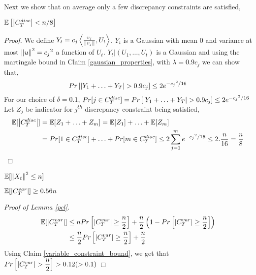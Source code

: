 Next we show that on average only a few discrepancy constraints are satisfied,
\begin{Claim}
$\mathbb{E}\left[\left\lvert C_T^{disc} \right\rvert < n/8 \right]$
\end{Claim}
\begin{proof}
We define $Y_t = c_j\left\langle \frac{v_j}{\left\lVert v_j \right\rVert},U_t\right\rangle$. $Y_t$ is a Gaussian with mean 0 and variance at most $\left\lVert u \right\rVert^2 = {c_j}^2$ a function of $U_t$.
$Y_t|(U_1,\hdots,U_t)$ is a Gaussian and using the martingale bound in Claim \ref{gaussian_properties},  with $\lambda = 0.9c_j$ we can show that,
\[Pr\left[ \left\lvert Y_1+\hdots+Y_T \right\rvert > 0.9c_j \right] \leq 2e^{{-c_j}^2/16}\]
For our choice of $\delta = 0.1$, $Pr[j \in C_T^{disc}] = Pr\left[ \left\lvert Y_1+\hdots+Y_T \right\rvert > 0.9c_j \right] \leq 2e^{{-c_j}^2/16}$
Let $Z_j$ be indicator for $j^{th}$ discrepancy constraint being satisfied,
\begin{align*}
    \mathbb{E}[\left\lvert C_T^{disc} \right\rvert] 
    &= \mathbb{E}[Z_1+\hdots+Z_m]
    = \mathbb{E}[Z_1] + \hdots + \mathbb{E}[Z_m]\\
    &= Pr[1 \in C_T^{disc}] + \hdots + Pr[m \in C_T^{disc}]
    \leq 2\sum_{j=1}^{m}{e^{{-c_j}^2/16}} \leq 2.\dfrac{n}{16} = \dfrac{n}{8}
\end{align*}
\end{proof}
\begin{Claim}
$\mathbb{E}[\left\lVert X_t \right\rVert^2 \leq n]$
\end{Claim}
\begin{Claim} \label{variable_constraint_bound}
$\mathbb{E}[\left\lvert C_T^{var} \right\rvert] \geq 0.56n$
\end{Claim}
\begin{proof}[Proof of Lemma \ref{pcl}]
\begin{align*}
  \mathbb{E}[\left\lvert C_T^{var} \right\rvert] 
&\leq nPr\left[\left\lvert C_T^{var} \right\rvert \geq \dfrac{n}{2}\right] + \dfrac{n}{2}\left(1- Pr\left[\left\lvert C_T^{var} \right\rvert \geq \dfrac{n}{2}\right] \right )\\
&\leq \dfrac{n}{2}Pr\left[\left\lvert C_T^{var} \right\rvert \geq \dfrac{n}{2}\right]  + \dfrac{n}{2}
\end{align*}
Using Claim \ref{variable_constraint_bound}, we get that $Pr\left[\left\lvert C_T^{var} \right\rvert > \dfrac{n}{2}\right] > 0.12 (> 0.1)$
\end{proof}
